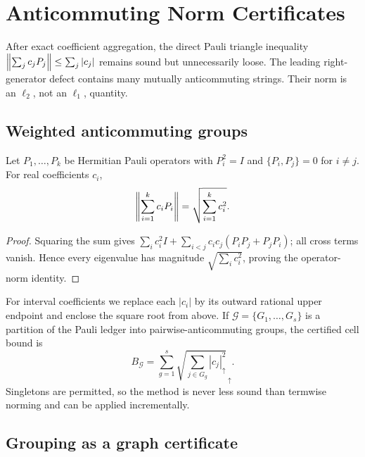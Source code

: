 \section{Anticommuting Norm Certificates}
\label{sec:norm}

After exact coefficient aggregation, the direct Pauli triangle inequality
$\left\lVert \sum_j c_jP_j\right\rVert\leq\sum_j|c_j|$ remains sound but unnecessarily loose.
The leading right-generator defect contains many mutually anticommuting
strings.  Their norm is an $\ell_2$, not an $\ell_1$, quantity.

\subsection{Weighted anticommuting groups}

\begin{lemma}
\label{lem:anticommuting}
Let $P_1,\ldots,P_k$ be Hermitian Pauli operators with $P_i^2=I$ and
$\{P_i,P_j\}=0$ for $i\neq j$.  For real coefficients $c_i$,
\begin{equation}
  \left\lVert \sum_{i=1}^{k}c_iP_i\right\rVert=\sqrt{\sum_{i=1}^{k}c_i^2}.
  \label{eq:anticommuting-norm}
\end{equation}
\end{lemma}

\begin{proof}
Squaring the sum gives
$\sum_i c_i^2I+\sum_{i<j}c_ic_j(P_iP_j+P_jP_i)$; all cross terms vanish.
Hence every eigenvalue has magnitude $\sqrt{\sum_i c_i^2}$, proving the
operator-norm identity.
\end{proof}

For interval coefficients we replace each $|c_i|$ by its outward rational
upper endpoint and enclose the square root from above.  If
$\mathcal G=\{G_1,\ldots,G_s\}$ is a partition of the Pauli ledger into
pairwise-anticommuting groups, the certified cell bound is
\begin{equation}
 B_{\mathcal G}=\sum_{g=1}^{s}
       \sqrt{\sum_{j\in G_g}|c_j|_\uparrow^2}_{\,\uparrow}.
 \label{eq:grouped-bound}
\end{equation}
Singletons are permitted, so the method is never less sound than termwise
norming and can be applied incrementally.

\subsection{Grouping as a graph certificate}


